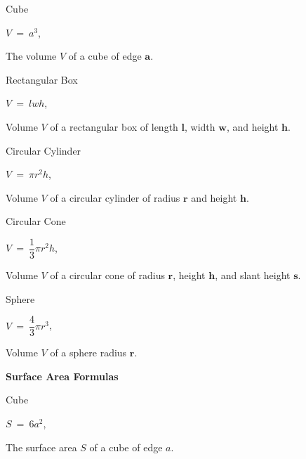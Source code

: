 \documentclass{article}
\begin{document}
\begin{large}
\hspace{0.1in} Cube

\hspace{1.5in} $V\ =\ a^{3}$,\hspace{0.2in} \begin{large}The volume $V$ of a cube of edge $\textbf{a}$.\end{large}

\hspace{0.1in} Rectangular Box

\hspace{1.0in} $V\ =\ lwh$,\hspace{0.2in} \begin{large}Volume $V$ of a rectangular box of length $\textbf{l}$, width $\textbf{w}$, and height $\textbf{h}$.\end{large}

\hspace{0.1in} Circular Cylinder

\hspace{1.0in} $V\ =\ \pi r^{2}h$,\hspace{0.2in} \begin{large}Volume $V$ of a circular cylinder of radius $\textbf{r}$ and height $\textbf{h}$.\end{large}

\hspace{0.1in} Circular Cone

\hspace{0.9in} $V\ =\ \dfrac{1}{3}\pi r^{2}h$,\hspace{0.2in} \begin{large}Volume $V$ of a circular cone of radius $\textbf{r}$, height $\textbf{h}$, and slant height $\textbf{s}$.\end{large}

\hspace{0.1in} Sphere

\hspace{1.5in} $V\ =\ \dfrac{4}{3}\pi r^{3}$,\hspace{0.2in} \begin{large}Volume $V$ of a sphere radius $\textbf{r}$.\end{large}

\vspace{0.1in}
\textbf{Surface Area Formulas}

\hspace{0.1in} Cube

\hspace{1.5in} $S\ =\ 6a^{2}$,\hspace{0.2in} \begin{large}The surface area $S$ of a cube of edge $a$.\end{large}


\end{large}
\end{document}
